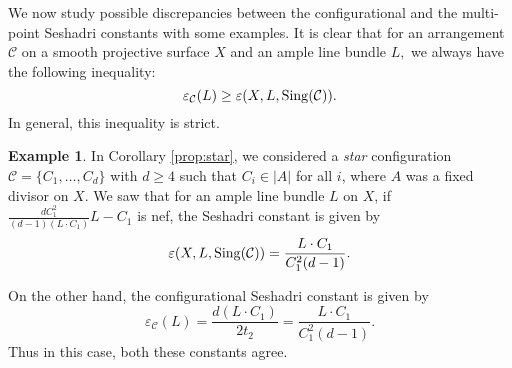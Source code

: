 \documentclass[12pt,reqno]{amsart}
\theoremstyle{plain}
\numberwithin{equation}{section}
\theoremstyle{definition}
\newtheorem{example}[theorem]{Example}
\begin{document}
	We now study possible discrepancies between the configurational and the multi-point Seshadri constants with some examples. It is clear that for an arrangement $\mathcal{C}$ on a smooth projective surface $X$ and an ample line bundle $L,$ we always have the following inequality: 
	$$\varepsilon_\mathcal{C}(L) \geq \varepsilon(X, L,{\rm Sing}(\mathcal{C})).$$
	In general, this inequality is strict. 
	\begin{example}
		In Corollary \ref{prop:star}, we considered a \emph{star} configuration $\mathcal{C} = \{C_{1}, \ldots, C_{d}\}$ with $d \geq 4$ such that $ C_i \in |A|$ for all $i$, where $A$ was a fixed divisor on $X$. We saw that for an ample line bundle $L$  on $X$, if 
		$\frac{dC_1^2}{(d-1)(L\cdot C_1)}L-C_1$ is nef, the Seshadri constant is given by
		$$\varepsilon(X, L,{\rm Sing}(\mathcal{C})) = \frac{L\cdot C_1}{C_1^2(d-1)}.$$
		
		On the other hand, the configurational Seshadri constant is given by
		$$	\varepsilon_\mathcal{C}(L)= \frac{d(L\cdot C_1)}{2t_2}= \frac{L\cdot C_1}{C_1^2(d-1)}.$$
		Thus in this case, both these constants agree.
	\end{example}
	
\end{document}
